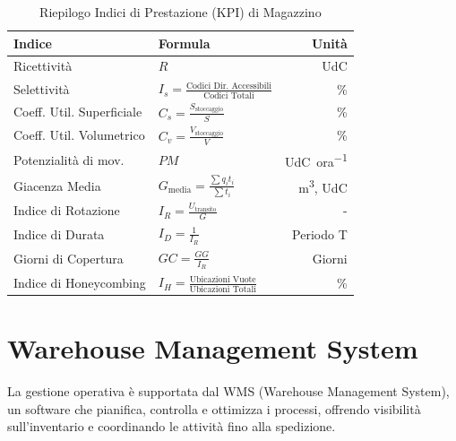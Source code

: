 \begin{table}
    \centering
    \renewcommand{\arraystretch}{1.8} %
    \begin{tabular}{llr} %
        \toprule
        \textbf{Indice}           & \textbf{Formula}                                                      & \textbf{Unità}     \\
        \midrule
        Ricettività               & $R$                                                                   & UdC                \\
        Selettività               & $I_{s} = \frac{\text{Codici Dir. Accessibili}}{\text{Codici Totali}}$ & \%                 \\
        Coeff. Util. Superficiale & $C_{s} = \frac{S_{\text{stoccaggio}}}{S}$                             & \%                 \\
        Coeff. Util. Volumetrico  & $C_{v} = \frac{V_{\text{stoccaggio}}}{V}$                             & \%                 \\
        Potenzialità di mov.      & $PM$                                                                  & \si{UdC\per ora}   \\
        Giacenza Media            & $G_{\text{media}} = \frac{\sum q_{i}t_{i}}{\sum t_{i}}$               & \si{m^3}, \si{UdC} \\
        Indice di Rotazione       & $I_{R} = \frac{U_{\text{transito}}}{G}$                               & -                  \\
        Indice di Durata          & $I_{D}=\frac{1}{I_{R}}$                                               & Periodo T          \\
        Giorni di Copertura       & $GC = \frac{GG}{I_{R}}$                                               & Giorni             \\
        Indice di Honeycombing    & $I_{H} = \frac{\text{Ubicazioni Vuote}}{\text{Ubicazioni Totali}}$    & \%                 \\
        \bottomrule
    \end{tabular}
    \caption{Riepilogo Indici di Prestazione (KPI) di Magazzino}\label{tab:kpi_summary}
\end{table}

%
\section{Warehouse Management System}
La gestione operativa è supportata dal WMS (Warehouse Management System), un software che pianifica, controlla e ottimizza i processi, offrendo visibilità sull'inventario e coordinando le attività fino alla spedizione.

